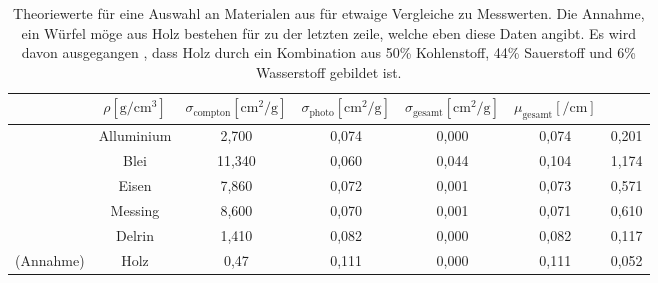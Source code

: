 \begin{table}
    \centering
    \caption{Theoriewerte für eine Auswahl an Materialen aus \cite{...} für etwaige Vergleiche zu Messwerten.
            Die Annahme, ein Würfel möge aus Holz bestehen für zu der letzten zeile, welche eben diese Daten angibt. Es wird davon ausgegangen \cite{holz}, dass
            Holz durch ein Kombination aus 50\% Kohlenstoff, 44\% Sauerstoff und 6\% Wasserstoff gebildet ist. } 
    \label{tab:1}
    \begin{tabular}{c c c c c c c}
    \toprule
     & $\rho [\si{\gram\per\centi\meter^3}]$ & $\sigma_{\text{compton}} [\si{\centi\meter^2\per\gram}] $ & $\sigma_{\text{photo}} [\si{\centi\meter^2\per\gram}] $  & $\sigma_{\text{gesamt}} [\si{\centi\meter^2\per\gram}]$ &  $\mu_{\text{gesamt}}[\si{\per\centi\meter}]$ \\
    \midrule
    ~ &Alluminium  &2,700 & 0,074   & 0,000 & 0,074 &  0,201 \\        
    ~ &Blei        &11,340& 0,060   & 0,044 & 0,104 &  1,174 \\    
    ~ &Eisen       &7,860 & 0,072   & 0,001 & 0,073 &  0,571 \\    
    ~ &Messing     &8,600 & 0,070   & 0,001 & 0,071 &  0,610 \\    
    ~ &Delrin      &1,410 & 0,082   & 0,000 & 0,082 &  0,117 \\    
    (Annahme) & Holz &  0,47 & 0,111  & 0,000 & 0,111 & 0,052 \\
\end{tabular}
\end{table}



